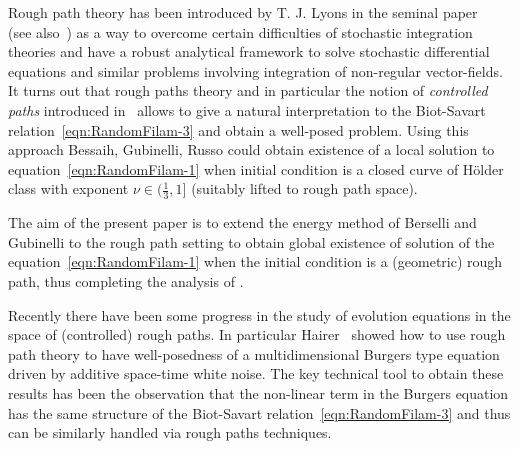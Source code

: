 \documentclass[11pt,a4paper,leqno]{amsart}%
\theoremstyle{plain}
\theoremstyle{remark}
\theoremstyle{plain}
\numberwithin{equation}{section}
\begin{document}
Rough path theory has been introduced by T. J. Lyons in the seminal paper~\cite{[Lyons-1998]} (see also~\cites{[LyonsQian-2002],[LionsStFlour],[FrizVictoir]}) as a way to overcome certain difficulties of stochastic integration theories and have a robust analytical framework to solve stochastic differential equations and similar problems involving integration of non-regular vector-fields. 
It turns out that rough paths theory and in particular the notion of \emph{controlled paths} introduced in~\cite{[Gubinelli-2004]} allows to give a natural interpretation to the Biot-Savart relation~\eqref{eqn:RandomFilam-3} and obtain a well-posed problem. Using this approach  Bessaih, Gubinelli, Russo \cite{[Bess+Gub_2005]} could obtain existence of a local solution to  equation~\eqref{eqn:RandomFilam-1} when initial condition is a closed curve of
H\"{o}lder class with exponent $\nu\in (\frac{1}{3},1]$ (suitably lifted to rough path space).

The aim of the present paper is to extend the energy method of Berselli and Gubinelli to the rough path setting to obtain  global existence of solution of the equation~\eqref{eqn:RandomFilam-1}  when the initial condition is a (geometric) rough path, thus completing the analysis of \cite{[Bess+Gub_2005]}.

Recently there have been some progress in the study of evolution equations in the space of (controlled) rough paths. In particular Hairer~\cite{Hairer} showed how to use rough path theory to have well-posedness of a multidimensional Burgers type equation driven by additive space-time white noise. The key technical tool to obtain these results has been the observation that the non-linear term in the Burgers equation has the same structure of the Biot-Savart relation~\eqref{eqn:RandomFilam-3} and thus can be similarly handled via rough paths techniques.
\end{document}
